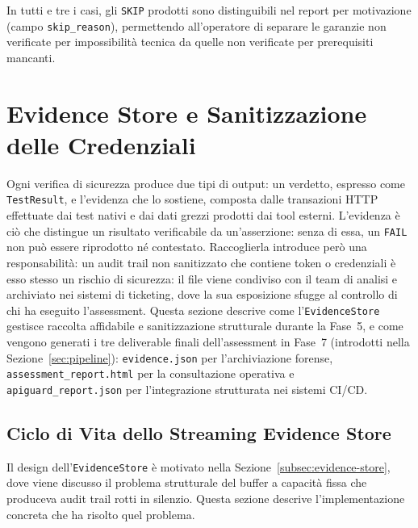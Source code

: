 In tutti e tre i casi, gli \texttt{SKIP} prodotti sono distinguibili nel report per motivazione (campo \texttt{skip\_reason}), permettendo all'operatore di separare le garanzie non verificate per impossibilità tecnica da quelle non verificate per prerequisiti mancanti.


\section{Evidence Store e Sanitizzazione delle Credenziali}%
\label{sec:evidence-sanitization}

Ogni verifica di sicurezza produce due tipi di output: un verdetto, espresso come \texttt{TestResult}, e l'evidenza che lo sostiene, composta dalle transazioni \gls{HTTP} effettuate dai test nativi e dai dati grezzi prodotti dai tool esterni. L'evidenza è ciò che distingue un risultato verificabile da un'asserzione: senza di essa, un \texttt{FAIL} non può essere riprodotto né contestato. Raccoglierla introduce però una responsabilità: un audit trail non sanitizzato che contiene token o credenziali è esso stesso un rischio di sicurezza: il file viene condiviso con il team di analisi e archiviato nei sistemi di ticketing, dove la sua esposizione sfugge al controllo di chi ha eseguito l'assessment.
Questa sezione descrive come l'\texttt{EvidenceStore} gestisce raccolta affidabile e sanitizzazione strutturale durante la Fase~5, e come vengono generati i tre deliverable finali dell'assessment in Fase~7 (introdotti nella Sezione~\ref{sec:pipeline}): \texttt{evidence.json} per l'archiviazione forense, \texttt{assessment\_report.html} per la consultazione operativa e \texttt{apiguard\_report.json} per l'integrazione strutturata nei sistemi \gls{CI/CD}.

\subsection{Ciclo di Vita dello Streaming Evidence Store}\label{subsec:evidence-lifecycle}

Il design dell'\texttt{EvidenceStore} è motivato nella Sezione~\ref{subsec:evidence-store}, dove viene discusso il problema strutturale del buffer a capacità fissa che produceva audit trail rotti in silenzio. Questa sezione descrive l'implementazione concreta che ha risolto quel problema.

